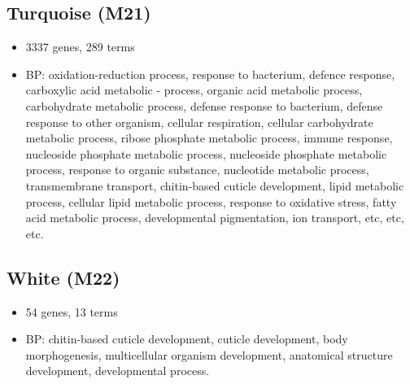 \documentclass[]{article}
\providecommand{\tightlist}{%
  \setlength{\itemsep}{0pt}\setlength{\parskip}{0pt}}
\begin{document}
\hypertarget{turquoise-m21}{%
\subsection{Turquoise (M21)}\label{turquoise-m21}}

\begin{itemize}
\tightlist
\item
  3337 genes, 289 terms
\item
  BP: oxidation-reduction process, response to bacterium, defence
  response, carboxylic acid metabolic - process, organic acid metabolic
  process, carbohydrate metabolic process, defense response to
  bacterium, defense response to other organism, cellular respiration,
  cellular carbohydrate metabolic process, ribose phosphate metabolic
  process, immune response, nucleoside phosphate metabolic process,
  nucleoside phosphate metabolic process, response to organic substance,
  nucleotide metabolic process, transmembrane transport, chitin-based
  cuticle development, lipid metabolic process, cellular lipid metabolic
  process, response to oxidative stress, fatty acid metabolic process,
  developmental pigmentation, ion transport, etc, etc, etc.
\end{itemize}

\hypertarget{white-m22}{%
\subsection{White (M22)}\label{white-m22}}

\begin{itemize}
\tightlist
\item
  54 genes, 13 terms
\item
  BP: chitin-based cuticle development, cuticle development, body
  morphogenesis, multicellular organism development, anatomical
  structure development, developmental process.
\end{itemize}
\end{document}
